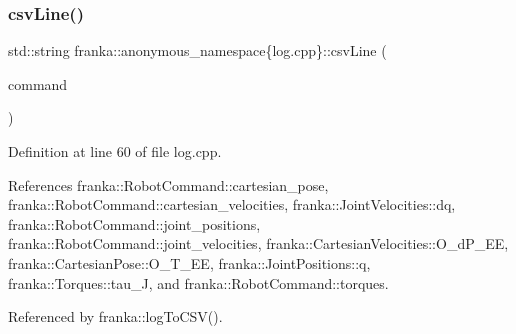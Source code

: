 \subsubsection{\texorpdfstring{csv\+Line()}{csvLine()}\hspace{0.1cm}{\footnotesize\ttfamily [2/2]}}
{\footnotesize\ttfamily std\+::string franka\+::anonymous\+\_\+namespace\{log.\+cpp\}\+::csv\+Line (\begin{DoxyParamCaption}\item[{const \hyperlink{structfranka_1_1RobotCommand}{franka\+::\+Robot\+Command} \&}]{command }\end{DoxyParamCaption})}



Definition at line 60 of file log.\+cpp.



References franka\+::\+Robot\+Command\+::cartesian\+\_\+pose, franka\+::\+Robot\+Command\+::cartesian\+\_\+velocities, franka\+::\+Joint\+Velocities\+::dq, franka\+::\+Robot\+Command\+::joint\+\_\+positions, franka\+::\+Robot\+Command\+::joint\+\_\+velocities, franka\+::\+Cartesian\+Velocities\+::\+O\+\_\+d\+P\+\_\+\+EE, franka\+::\+Cartesian\+Pose\+::\+O\+\_\+\+T\+\_\+\+EE, franka\+::\+Joint\+Positions\+::q, franka\+::\+Torques\+::tau\+\_\+J, and franka\+::\+Robot\+Command\+::torques.



Referenced by franka\+::log\+To\+C\+S\+V().


